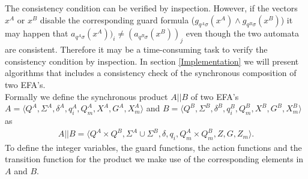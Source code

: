 \documentclass{article}
\begin{document}
The consistency condition can be verified by inspection. However,
if the vectors $x^{A}$ or $x^{B}$ disable the corresponding guard
formula ($g_{q^A \sigma}(x^{A})\wedge g_{q^B \sigma}(x^{B})$) it
may happen that $a_{q^A \sigma}(x^{A}))_i \neq (a_{q^B
\sigma}(x^{B}))_j$ even though the two automata are consistent.
Therefore it may be a time-consuming task to verify the
consistency condition by inspection. In section
\ref{Implementation} we will present algorithms that includes a
consistency check of the synchronous
composition of two EFA's. \\

Formally we define the synchronous product $A||B$ of two EFA's
$A=\langle Q^A, \Sigma^A, \delta^A, q^A_i, Q^A_m, X^{A}, G^A,X^A_m
\rangle$ and $B=\langle Q^B, \Sigma^B, \delta^B, q^B_i, Q^B_m,
X^{B}, G^B,X^B_m
 \rangle$ as
\begin{eqnarray}
A||B=\langle Q^A\times Q^B, \Sigma^A \cup \Sigma^B , \delta, q_i,
Q^A_m\times Q^B_m, Z, G, Z_m \rangle.
\end{eqnarray}
To define the integer variables, the guard functions, the action
functions and the transition function for the product we make use
of the corresponding elements in $A$ and $B$.
\end{document}
